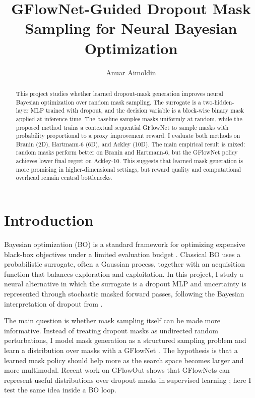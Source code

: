 \documentclass{article}
\title{GFlowNet-Guided Dropout Mask Sampling for Neural Bayesian Optimization}
\author{Anuar Aimoldin}
\date{}
\begin{document}
\maketitle

\begin{abstract}
This project studies whether learned dropout-mask generation improves neural Bayesian optimization over random mask sampling. The surrogate is a two-hidden-layer MLP trained with dropout, and the decision variable is a block-wise binary mask applied at inference time. The baseline samples masks uniformly at random, while the proposed method trains a contextual sequential GFlowNet to sample masks with probability proportional to a proxy improvement reward. I evaluate both methods on Branin (2D), Hartmann-6 (6D), and Ackley (10D). The main empirical result is mixed: random masks perform better on Branin and Hartmann-6, but the GFlowNet policy achieves lower final regret on Ackley-10. This suggests that learned mask generation is more promising in higher-dimensional settings, but reward quality and computational overhead remain central bottlenecks.
\end{abstract}

\section{Introduction}

Bayesian optimization (BO) is a standard framework for optimizing expensive black-box objectives under a limited evaluation budget \cite{snoek2012practical}. Classical BO uses a probabilistic surrogate, often a Gaussian process, together with an acquisition function that balances exploration and exploitation. In this project, I study a neural alternative in which the surrogate is a dropout MLP and uncertainty is represented through stochastic masked forward passes, following the Bayesian interpretation of dropout from \citet{gal2016dropout}.

The main question is whether mask sampling itself can be made more informative. Instead of treating dropout masks as undirected random perturbations, I model mask generation as a structured sampling problem and learn a distribution over masks with a GFlowNet \cite{bengio2023gflownet}. The hypothesis is that a learned mask policy should help more as the search space becomes larger and more multimodal. Recent work on GFlowOut shows that GFlowNets can represent useful distributions over dropout masks in supervised learning \cite{liu2023gflowout}; here I test the same idea inside a BO loop.
\end{document}
